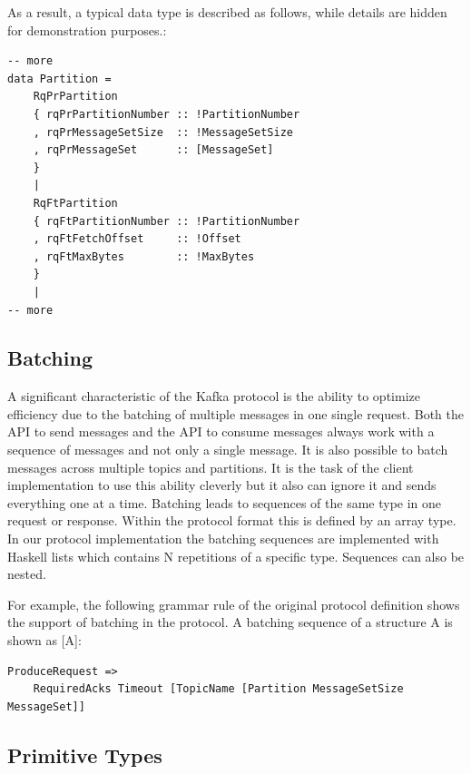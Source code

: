 As a result, a typical data type is described as follows, while details are
hidden for demonstration purposes.:

\begin{lstlisting}[caption={Example of defined protocol types with name
convention}]
-- more
data Partition =
    RqPrPartition
    { rqPrPartitionNumber :: !PartitionNumber
    , rqPrMessageSetSize  :: !MessageSetSize
    , rqPrMessageSet      :: [MessageSet]
    }
    |
    RqFtPartition
    { rqFtPartitionNumber :: !PartitionNumber
    , rqFtFetchOffset     :: !Offset
    , rqFtMaxBytes        :: !MaxBytes
    }
    |
-- more
\end{lstlisting}


\subsection{Batching}
\label{impl-prot-batching}
A significant characteristic of the Kafka protocol is the ability to optimize
efficiency due to the batching of multiple messages in one single request. Both
the API to send messages and the API to consume messages always work with a
sequence of messages and not only a single message. It is also possible to batch
messages across multiple topics and partitions. It is the task of the client
implementation to use this ability cleverly but it also can ignore it and sends everything
one at a time. Batching leads to sequences of the same type in one request or response. Within
the protocol format this is defined by an array type. In our protocol
implementation the batching sequences are implemented with Haskell lists which
contains N repetitions of a specific type. Sequences can also be nested. 

For example, the following grammar rule of the original protocol definition
shows the support of batching in the protocol. A batching sequence of a
structure A is shown as [A]: \cite{kafka-protocol}
\begin{verbatim}
ProduceRequest => 
    RequiredAcks Timeout [TopicName [Partition MessageSetSize MessageSet]]
\end{verbatim}

\subsection{Primitive Types}
\label{subsec:protocol-types-primitive}


